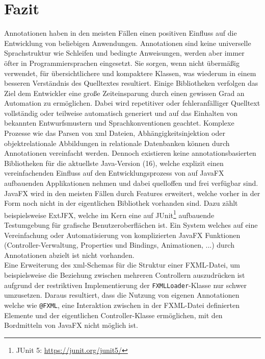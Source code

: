 \section{Fazit}
\label{ms_fazit}
Annotationen haben in den meisten Fällen einen positiven Einfluss auf die Entwicklung von beliebigen Anwendungen. Annotationen sind keine universelle Sprachstruktur wie Schleifen und bedingte Anweisungen, werden aber immer öfter in Programmiersprachen eingesetzt. Sie sorgen, wenn nicht übermäßig verwendet, für übersichtlichere und kompaktere Klassen, was wiederum in einem besseren Verständnis des Quelltextes resultiert. Einige Bibliotheken verfolgen das Ziel dem Entwickler eine große  Zeiteinsparung durch einen gewissen Grad an Automation zu ermöglichen. Dabei wird repetitiver oder fehleranfälliger Quelltext vollständig oder teilweise automatisch generiert und auf das Einhalten von bekannten Entwurfsmustern und Sprachkonventionen geachtet. Komplexe Prozesse wie das Parsen von \ac{xml} Dateien, Abhängigkeitsinjektion oder objektrelationale Abbildungen in relationale Datenbanken können durch Annotationen vereinfacht werden. Dennoch existieren keine annotationsbasierten Bibliotheken für die aktuellste Java-Version (16), welche explizit einen vereinfachenden Einfluss auf den Entwicklungsprozess von auf JavaFX aufbauenden Applikationen nehmen und dabei quelloffen und frei verfügbar sind. JavaFX wird in den meisten Fällen durch Features erweitert, welche vorher in der Form noch nicht in der eigentlichen Bibliothek vorhanden sind. Dazu zählt beispielsweise ExtJFX, welche im Kern eine auf JUnit\footnote{JUnit 5: \url{https://junit.org/junit5/}} aufbauende Testumgebung für grafische Benutzeroberflächen ist. Ein System welches auf eine Vereinfachung oder Automatisierung von komplizierten JavaFX Funktionen (Controller-Verwaltung, Properties und Bindings, Animationen, ...) durch Annotationen abzielt ist nicht vorhanden.\\
Eine Erweiterung des \ac{xml}-Schemas für die Struktur einer FXML-Datei, um beispielsweise die Beziehung zwischen mehreren Controllern auszudrücken ist aufgrund der restriktiven Implementierung der \texttt{FXMLLoader}-Klasse nur schwer umzusetzen. Daraus resultiert, dass die Nutzung von eigenen Annotationen welche wie \texttt{@FXML}, eine Interaktion zwischen in der FXML-Datei definierten Elemente und der eigentlichen Controller-Klasse ermöglichen, mit den Bordmitteln von JavaFX nicht möglich ist.

